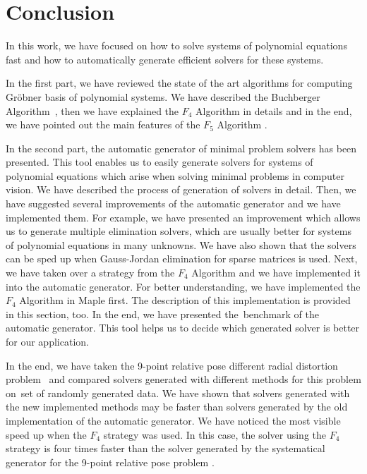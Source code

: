 \chapter{Conclusion}
In this work, we have focused on how to solve systems of polynomial equations fast and how to automatically generate efficient solvers for these systems.

In the first part, we have reviewed the state of the art algorithms for computing Gr\"obner basis of polynomial systems. We have described the Buchberger Algorithm~\cite{Buchberger65}, then we have explained the $F_4$ Algorithm \cite{F4} in details and in the end, we have pointed out the main features of the $F_5$ Algorithm \cite{F5}.

In the second part, the automatic generator \cite{AutoGen} of minimal problem solvers has been presented. This tool enables us to easily generate solvers for systems of polynomial equations which arise when solving minimal problems in computer vision. We have described the process of generation of solvers in detail. Then, we have suggested several improvements of the automatic generator and we have implemented them. For example, we have presented an improvement which allows us to generate multiple elimination solvers, which are usually better for systems of polynomial equations in many unknowns. We have also shown that the solvers can be sped up when Gauss-Jordan elimination for sparse matrices is used. Next, we have taken over a strategy from the $F_4$ Algorithm \cite{F4} and we have implemented it into the automatic generator. For better understanding, we have implemented the $F_4$ Algorithm \cite{F4} in Maple first. The description of this implementation is provided in this section, too. In the end, we have presented the~benchmark of the automatic generator. This tool helps us to decide which generated solver is better for our application.

In the end, we have taken the 9-point relative pose different radial distortion problem~\cite{9pt} and compared solvers generated with different methods for this problem on~set of randomly generated data. We have shown that solvers generated with the new implemented methods may be faster than solvers generated by the old implementation of the automatic generator. We have noticed the most visible speed up when the $F_4$ strategy was used. In this case, the solver using the $F_4$ strategy is four times faster than the solver generated by the systematical generator for the 9-point relative pose problem \cite{9pt}.
